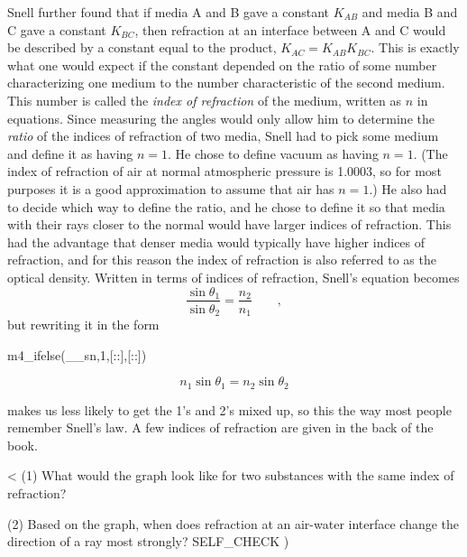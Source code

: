 Snell further found that if media A and B gave a constant
$K_{AB}$ and media B and C gave a constant $K_{BC}$,
then refraction at an interface between A and C would be
described by a constant equal to the product, $K_{AC}=K_{AB}K_{BC}$.
This is exactly what one would expect if the constant
depended on the ratio of some number characterizing one
medium to the number characteristic of the second medium.
This number is called the 
\emph{index of refraction} of the medium, written as $n$ in
equations. Since measuring the angles would only allow him
to determine the \emph{ratio} of the indices of refraction
of two media, Snell had to pick some medium and define it as
having $n=1$. He chose to define vacuum as having $n=1$.
(The index of refraction of air at normal atmospheric
pressure is 1.0003, so for most purposes it is a good
approximation to assume that air has $n=1$.) He also had to
decide which way to define the ratio, and he chose to define
it so that media with their rays closer to the normal would
have larger indices of refraction. This had the advantage
that denser media would typically have higher indices of
refraction, and for this reason the index of refraction is
also referred to as the optical density. Written in terms of
indices of refraction, Snell's equation becomes
\begin{equation*}
  \frac{\sin\theta_1}{\sin\theta_2} = \frac{n_2}{n_1} \qquad ,
\end{equation*}
but rewriting it in the form

m4_ifelse(__sn,1,[::],[:\pagebreak:])

\begin{equation*}
n_1 \sin \theta_1=n_2 \sin \theta_2
\end{equation*}
\begin{longnoteafterequation}
\end{longnoteafterequation}
\noindent makes us less likely to get the 1's and 2's mixed up, so
this the way most people remember Snell's law. A few indices
of refraction are given in the back of the book.

<%
(1) What would the graph look like for two substances with
the same index of refraction?

(2) Based on the graph, when does refraction at an air-water
interface change the direction of a ray most strongly?
  SELF_CHECK
  ) %


